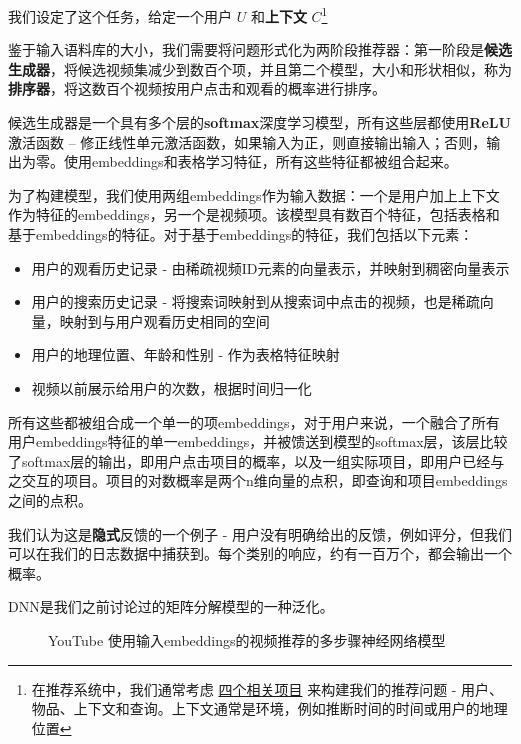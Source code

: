\documentclass[Chinese, 11pt, table]{diazessay} %
\begin{document}
\begin{CJK}{UTF8}{gbsn}
\begin{sloppypar}
我们设定了这个任务，给定一个用户 $U$ 和\textbf{上下文} $C$\footnote{在推荐系统中，我们通常考虑 \href{https://md.ekstrandom.net/blog/2015/10/search-and-recsys}{四个相关项目} 来构建我们的推荐问题 - 用户、物品、上下文和查询。上下文通常是环境，例如推断时间的时间或用户的地理位置}

鉴于输入语料库的大小，我们需要将问题形式化为两阶段推荐器：第一阶段是\textbf{候选生成器}，将候选视频集减少到数百个项，并且第二个模型，大小和形状相似，称为\textbf{排序器}，将这数百个视频按用户点击和观看的概率进行排序。

候选生成器是一个具有多个层的\textbf{softmax}深度学习模型，所有这些层都使用\textbf{ReLU}激活函数 -- 修正线性单元激活函数，如果输入为正，则直接输出输入；否则，输出为零。使用embeddings和表格学习特征，所有这些特征都被组合起来。


为了构建模型，我们使用两组embeddings作为输入数据：一个是用户加上上下文作为特征的embeddings，另一个是视频项。该模型具有数百个特征，包括表格和基于embeddings的特征。对于基于embeddings的特征，我们包括以下元素：

\begin{itemize}
  \item 用户的观看历史记录 - 由稀疏视频ID元素的向量表示，并映射到稠密向量表示
  \item 用户的搜索历史记录 - 将搜索词映射到从搜索词中点击的视频，也是稀疏向量，映射到与用户观看历史相同的空间
  \item 用户的地理位置、年龄和性别 - 作为表格特征映射
  \item 视频以前展示给用户的次数，根据时间归一化
\end{itemize}


所有这些都被组合成一个单一的项embeddings，对于用户来说，一个融合了所有用户embeddings特征的单一embeddings，并被馈送到模型的softmax层，该层比较了softmax层的输出，即用户点击项目的概率，以及一组实际项目，即用户已经与之交互的项目。项目的对数概率是两个n维向量的点积，即查询和项目embeddings之间的点积。

我们认为这是\textbf{隐式}反馈的一个例子 - 用户没有明确给出的反馈，例如评分，但我们可以在我们的日志数据中捕获到。每个类别的响应，约有一百万个，都会输出一个概率。

DNN是我们之前讨论过的矩阵分解模型的一种泛化。

\begin{figure}[H]
\caption{YouTube 使用输入embeddings的视频推荐的多步骤神经网络模型 \citep{covington2016deep}}
\end{figure}


\end{sloppypar}
\end{CJK}
\end{document}

